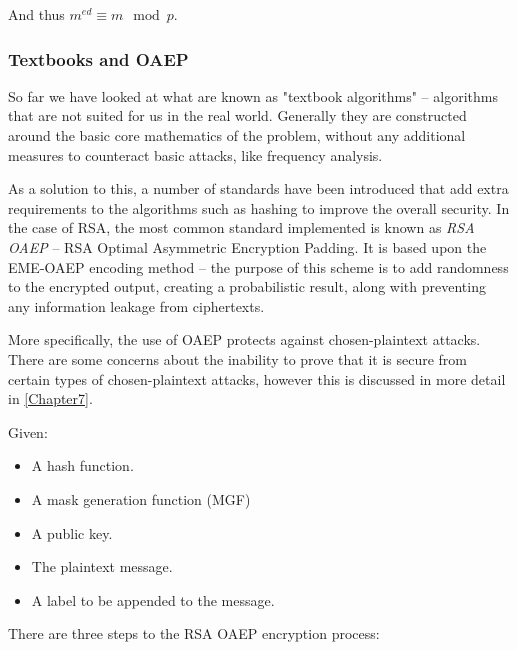     And thus $m^{ed} \equiv m \mod p$.
    
    \subsubsection{Textbooks and OAEP}
    \label{subsubsec:oaep}
    
    So far we have looked at what are known as "textbook algorithms" -- algorithms that are not suited for us in the real world. Generally they are constructed around the basic core mathematics of the problem, without any additional measures to counteract basic attacks, like frequency analysis. 
    
    As a solution to this, a number of standards have been introduced that add extra requirements to the algorithms such as hashing to improve the overall security. In the case of RSA, the most common standard implemented is known as \emph{RSA OAEP} -- RSA Optimal Asymmetric Encryption Padding\cite{Bellare:1995aa}. It is based upon the EME-OAEP encoding method -- the purpose of this scheme is to add randomness to the encrypted output, creating a probabilistic result, along with preventing any information leakage from ciphertexts.
    
    More specifically, the use of OAEP protects against chosen-plaintext attacks. There are some concerns about the inability to prove that it is secure from certain types of chosen-plaintext attacks, however this is discussed in more detail in \textsection\ref{Chapter7}.
    
    Given:
    
    \begin{itemize}
      \item A hash function.
      \item A mask generation function (MGF)
      \item A public key.
      \item The plaintext message.
      \item A label to be appended to the message.
    \end{itemize}
    
    There are three steps to the RSA OAEP encryption process:
    
